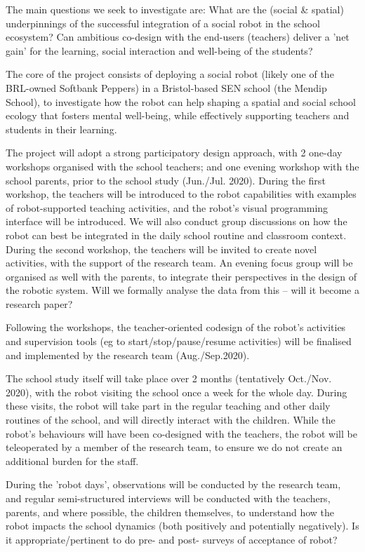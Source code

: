\documentclass[11pt]{report}
\begin{document}
The main questions we seek to investigate are: What are the (social \& spatial)
underpinnings of the successful integration of a social robot in the school
ecosystem? Can ambitious co-design with the end-users (teachers) deliver a 'net
gain' for the learning, social interaction and well-being of the students? 


The core of the project consists of deploying a social robot (likely one of the
BRL-owned Softbank Peppers) in a Bristol-based SEN school (the Mendip School),
to investigate how the robot can help shaping a spatial and social school
ecology that fosters mental well-being, while effectively supporting teachers
and students in their learning. 

The project will adopt a strong participatory design approach, with 2 one-day
workshops organised with the school teachers; and one evening workshop with the
school parents, prior to the school study (Jun./Jul. 2020). During the first
workshop, the teachers will be introduced to the robot capabilities with
examples of robot-supported teaching activities, and the robot's visual
programming interface will be introduced. We will also conduct group discussions
on how the robot can best be integrated in the daily school routine and
classroom context. During the second workshop, the teachers will be invited to
create novel activities, with the support of the research team. An evening focus
group will be organised as well with the parents, to integrate their
perspectives in the design of the robotic system.  Will we formally analyse the
data from this – will it become a research paper? 

Following the workshops, the teacher-oriented codesign of the robot's activities
and supervision tools (eg to start/stop/pause/resume activities) will be
finalised and implemented by the research team (Aug./Sep.2020). 

The school study itself will take place over 2 months (tentatively Oct./Nov.
2020), with the robot visiting the school once a week for the whole day. During
these visits, the robot will take part in the regular teaching and other daily
routines of the school, and will directly interact with the children. While the
robot's behaviours will have been co-designed with the teachers, the robot will
be teleoperated by a member of the research team, to ensure we do not create an
additional burden for the staff. 

During the 'robot days', observations will be conducted by the research team,
and regular semi-structured interviews will be conducted with the teachers,
parents, and where possible, the children themselves, to understand how the
robot impacts the school dynamics  (both positively and potentially negatively).
Is it appropriate/pertinent to do pre- and post- surveys of acceptance of robot? 
\end{document}

